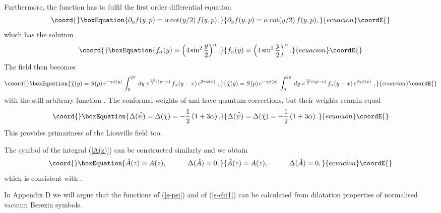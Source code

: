 \documentclass[a4paper,12pt]{article}
\begin{document}
\noindent
Furthermore, the function \coordHE{} has to fulfil the first order
differential equation
\begin{equation}\coord{}\boxEquation{\label{f_alpha}
\partial_yf(y,p)=\alpha\cot (y/2)\,f(y,p),
}{\partial_yf(y,p)=\alpha\cot (y/2)\,f(y,p),
}{ecuacion}\coordE{}\end{equation}
which has the solution
\begin{equation}\coord{}\boxEquation{\label{f-gamma}
f_\alpha (y) =\left(4\sin^2\frac{y}{2}\right)^{\alpha}.
}{f_\alpha (y) =\left(4\sin^2\frac{y}{2}\right)^{\alpha}.
}{ecuacion}\coordE{}\end{equation}
The field \coordHE{} then becomes
\begin{equation}\coord{}\boxEquation{\label{s-chi1}
{\check\chi}(y)=S(p)\,e^{-\gamma\phi (y)}\,\int_0^{2\pi}\,
dy\,\,e^{\frac{\gamma p}{2}\epsilon(y-x)}\,
f_\alpha (y-x)\,e^{2\gamma\phi(x)}\,\,,
}{{\check\chi}(y)=S(p)\,e^{-\gamma\phi (y)}\,\int_0^{2\pi}\,
dy\,\,e^{\frac{\gamma p}{2}\epsilon(y-x)}\,
f_\alpha (y-x)\,e^{2\gamma\phi(x)}\,\,,
}{ecuacion}\coordE{}\end{equation}
with the still arbitrary function \coordHE{}.
The conformal weights of \coordHE{} and \coordHE{}
have  quantum corrections,  but their weights remain equal
\begin{equation}\coord{}\boxEquation{\label{delta-psi-chi}
\Delta (\check \psi) = \Delta (\check \chi) =
-\frac{1}{2}\left(1+{3\alpha}\right).
}{\Delta (\check \psi) = \Delta (\check \chi) =
-\frac{1}{2}\left(1+{3\alpha}\right).
}{ecuacion}\coordE{}\end{equation}
This provides primariness of
the Liouville field too.

\noindent
The symbol of the integral \coordHE{} (\ref{A(z)})  can be constructed
similarly and we obtain
\begin{equation}\coord{}\boxEquation{\label{s-A}
   {\check A}(z) =A(z),~~~~~~~~~\Delta(\check A)=0,
}{{\check A}(z) =A(z),~~~~~~~~~\Delta(\check A)=0,
}{ecuacion}\coordE{}\end{equation}
which is consistent with
\coordHE{}.

\noindent
In Appendix D we will argue that the functions \coordHE{}
of (\ref{s-psi}) and \coordHE{} of (\ref{s-chi1}) can be calculated
from dilatation properties of normalised vacuum Berezin symbols.
\end{document}

